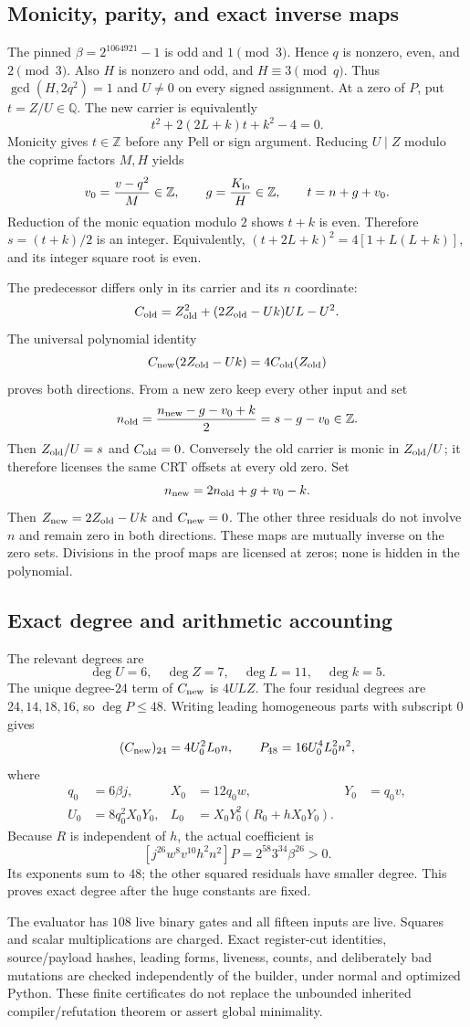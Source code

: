 \subsection{Monicity, parity, and exact inverse maps}
The pinned $\beta=2^{1064921}-1$ is odd and $1\pmod 3$.
Hence $q$ is nonzero, even, and $2\pmod3$.
Also $H$ is nonzero and odd, and $H\equiv3\pmod q$.
Thus $\gcd(H,2q^2)=1$ and $U\ne0$ on every signed assignment.
At a zero of $P$, put $t=Z/U\in\mathbb Q$.
The new carrier is equivalently
\[
 t^2+2(2L+k)t+k^2-4=0.
\]
Monicity gives $t\in\mathbb Z$ before any Pell or sign argument.
Reducing $U\mid Z$ modulo the coprime factors $M,H$ yields
\[
 v_0=\frac{v-q^2}{M}\in\mathbb Z,\qquad
 g=\frac{K_{\rm lo}}H\in\mathbb Z,\qquad t=n+g+v_0.
\]
Reduction of the monic equation modulo $2$ shows $t+k$ is even.
Therefore $s=(t+k)/2$ is an integer. Equivalently,
$(t+2L+k)^2=4[1+L(L+k)]$, and its integer square root is even.

The predecessor differs only in its carrier and its $n$ coordinate:
\[
 C_{\rm old}=Z_{\rm old}^2+(2Z_{\rm old}-Uk)UL-U^2.
\]
The universal polynomial identity
\[
 C_{\rm new}(2Z_{\rm old}-Uk)=4C_{\rm old}(Z_{\rm old})
\]
proves both directions. From a new zero keep every other input and set
\[
 n_{\rm old}=\frac{n_{\rm new}-g-v_0+k}{2}
             =s-g-v_0\in\mathbb Z.
\]
Then $Z_{\rm old}/U=s$ and $C_{\rm old}=0$.
Conversely the old carrier is monic in $Z_{\rm old}/U$;
it therefore licenses the same CRT offsets at every old zero. Set
\[
 n_{\rm new}=2n_{\rm old}+g+v_0-k.
\]
Then $Z_{\rm new}=2Z_{\rm old}-Uk$ and $C_{\rm new}=0$.
The other three residuals do not involve $n$ and remain zero in both directions.
These maps are mutually inverse on the zero sets. Divisions in the proof maps
are licensed at zeros; none is hidden in the polynomial.

\subsection{Exact degree and arithmetic accounting}
The relevant degrees are
\[
 \deg U=6,\quad \deg Z=7,\quad \deg L=11,\quad \deg k=5.
\]
The unique degree-$24$ term of $C_{\rm new}$ is $4ULZ$.
The four residual degrees are $24,14,18,16$, so $\deg P\le48$.
Writing leading homogeneous parts with subscript $0$ gives
\[
 (C_{\rm new})_{24}=4U_0^2L_0n,\qquad
 P_{48}=16U_0^4L_0^2n^2,
\]
where
\begin{align*}
 q_0&=6\beta j,& X_0&=12q_0w,&Y_0&=q_0v,\\
 U_0&=8q_0^2X_0Y_0,&
 L_0&=X_0Y_0^2(R_0+hX_0Y_0).
\end{align*}
Because $R$ is independent of $h$, the actual coefficient is
\[
 [j^{26}w^8v^{10}h^2n^2]P=2^{58}3^{34}\beta^{26}>0.
\]
Its exponents sum to $48$; the other squared residuals have smaller degree.
This proves exact degree after the huge constants are fixed.

The evaluator has $108$ live binary gates and all fifteen inputs are live.
Squares and scalar multiplications are charged. Exact register-cut identities,
source/payload hashes, leading forms, liveness, counts, and deliberately bad
mutations are checked independently of the builder, under normal and optimized
Python. These finite certificates do not replace the unbounded inherited
compiler/refutation theorem or assert global minimality.
